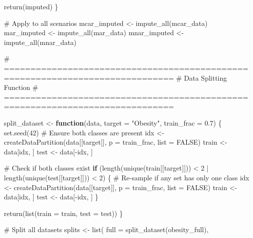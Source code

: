 \documentclass[
  letterpaper,
  DIV=11,
  numbers=noendperiod]{scrartcl}
\newenvironment{Shaded}{\begin{snugshade}}{\end{snugshade}}
\newcommand{\AttributeTok}[1]{\textcolor[rgb]{0.40,0.45,0.13}{#1}}
\newcommand{\CommentTok}[1]{\textcolor[rgb]{0.37,0.37,0.37}{#1}}
\newcommand{\ConstantTok}[1]{\textcolor[rgb]{0.56,0.35,0.01}{#1}}
\newcommand{\ControlFlowTok}[1]{\textcolor[rgb]{0.00,0.23,0.31}{\textbf{#1}}}
\newcommand{\DecValTok}[1]{\textcolor[rgb]{0.68,0.00,0.00}{#1}}
\newcommand{\FloatTok}[1]{\textcolor[rgb]{0.68,0.00,0.00}{#1}}
\newcommand{\FunctionTok}[1]{\textcolor[rgb]{0.28,0.35,0.67}{#1}}
\newcommand{\NormalTok}[1]{\textcolor[rgb]{0.00,0.23,0.31}{#1}}
\newcommand{\OtherTok}[1]{\textcolor[rgb]{0.00,0.23,0.31}{#1}}
\newcommand{\SpecialCharTok}[1]{\textcolor[rgb]{0.37,0.37,0.37}{#1}}
\newcommand{\StringTok}[1]{\textcolor[rgb]{0.13,0.47,0.30}{#1}}
\begin{document}
\begin{Shaded}
\begin{Highlighting}[]
  \FunctionTok{return}\NormalTok{(imputed)}
\NormalTok{\}}

\CommentTok{\# Apply to all scenarios}
\NormalTok{mcar\_imputed }\OtherTok{\textless{}{-}} \FunctionTok{impute\_all}\NormalTok{(mcar\_data)}
\NormalTok{mar\_imputed }\OtherTok{\textless{}{-}} \FunctionTok{impute\_all}\NormalTok{(mar\_data)}
\NormalTok{mnar\_imputed }\OtherTok{\textless{}{-}} \FunctionTok{impute\_all}\NormalTok{(mnar\_data)}

\CommentTok{\# ==============================================================================}
\CommentTok{\# Data Splitting Function}
\CommentTok{\# ==============================================================================}

\NormalTok{split\_dataset }\OtherTok{\textless{}{-}} \ControlFlowTok{function}\NormalTok{(data, }\AttributeTok{target =} \StringTok{"Obesity"}\NormalTok{, }\AttributeTok{train\_frac =} \FloatTok{0.7}\NormalTok{) \{}
  \FunctionTok{set.seed}\NormalTok{(}\DecValTok{42}\NormalTok{)}
  \CommentTok{\# Ensure both classes are present}
\NormalTok{  idx }\OtherTok{\textless{}{-}} \FunctionTok{createDataPartition}\NormalTok{(data[[target]], }\AttributeTok{p =}\NormalTok{ train\_frac, }\AttributeTok{list =} \ConstantTok{FALSE}\NormalTok{)}
\NormalTok{  train }\OtherTok{\textless{}{-}}\NormalTok{ data[idx, ]}
\NormalTok{  test  }\OtherTok{\textless{}{-}}\NormalTok{ data[}\SpecialCharTok{{-}}\NormalTok{idx, ]}
  
  \CommentTok{\# Check if both classes exist}
  \ControlFlowTok{if}\NormalTok{ (}\FunctionTok{length}\NormalTok{(}\FunctionTok{unique}\NormalTok{(train[[target]])) }\SpecialCharTok{\textless{}} \DecValTok{2} \SpecialCharTok{|} \FunctionTok{length}\NormalTok{(}\FunctionTok{unique}\NormalTok{(test[[target]])) }\SpecialCharTok{\textless{}} \DecValTok{2}\NormalTok{) \{}
    \CommentTok{\# Re{-}sample if any set has only one class}
\NormalTok{    idx }\OtherTok{\textless{}{-}} \FunctionTok{createDataPartition}\NormalTok{(data[[target]], }\AttributeTok{p =}\NormalTok{ train\_frac, }\AttributeTok{list =} \ConstantTok{FALSE}\NormalTok{)}
\NormalTok{    train }\OtherTok{\textless{}{-}}\NormalTok{ data[idx, ]}
\NormalTok{    test  }\OtherTok{\textless{}{-}}\NormalTok{ data[}\SpecialCharTok{{-}}\NormalTok{idx, ]}
\NormalTok{  \}}
  
  \FunctionTok{return}\NormalTok{(}\FunctionTok{list}\NormalTok{(}\AttributeTok{train =}\NormalTok{ train, }\AttributeTok{test =}\NormalTok{ test))}
\NormalTok{\}}

\CommentTok{\# Split all datasets}
\NormalTok{splits }\OtherTok{\textless{}{-}} \FunctionTok{list}\NormalTok{(}
  \AttributeTok{full =} \FunctionTok{split\_dataset}\NormalTok{(obesity\_full),}
  

\end{Highlighting}
\end{Shaded}
\end{document}
